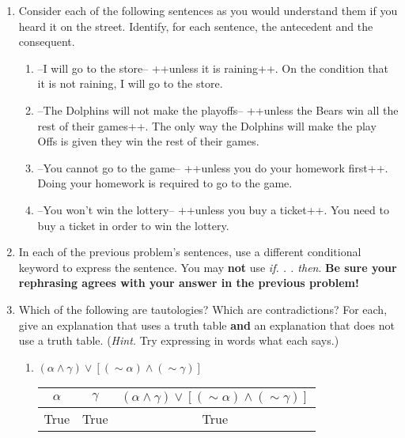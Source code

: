 \documentclass{letter}
\begin{document}
\begin{description}
\begin{enumerate}
\begin{enumerate}
	\end{enumerate}
	\item Consider each of the following sentences as you would understand them if you heard it on the street. Identify, for each sentence, the antecedent and the consequent.
			\begin{enumerate}\itemsep=1.25mm
				\item --I will go to the store-- ++unless it is raining++. On the condition that it is not raining, I will go to the store. \\
				\item --The Dolphins will not make the playoffs-- ++unless the Bears win all the rest of their games++. The only way the Dolphins will make the play Offs is given they win the rest of their games.\\
				\item  --You cannot go to the game-- ++unless you do your homework first++. Doing your homework is required to go to the game. \\
				\item  --You won't win the lottery-- ++unless you buy a ticket++. You need to buy a ticket in order to win the lottery.\\
			\end{enumerate}
	\item In each of the previous problem's sentences, use a different conditional keyword to express the sentence. You may {\bfseries not} use {\em if. . . then}. {\bfseries Be sure your rephrasing agrees with your answer in the previous problem!} \\
	\item Which of the following are tautologies? Which are contradictions? For each, give an explanation that uses a truth table {\bfseries and} an explanation that does not use a truth table. ({\em Hint.} Try expressing in words what each says.)
			\begin{enumerate}\itemsep=1.25mm
				\item $(\alpha\wedge \gamma)\vee \left[(\sim \alpha)\wedge(\sim\gamma)\right]$
                                  \begin{center}
                                  \begin{tabular}{||c|c|c||}
                                    \hline
                                    $\alpha$ & $\gamma$ & $(\alpha\wedge \gamma)\vee \left[(\sim \alpha)\wedge(\sim\gamma)\right]$ \\ \hline
                                    True & True & True \\ \hline

\end{tabular}
\end{center}
\end{enumerate}
\end{enumerate}
\end{description}
\end{document}
